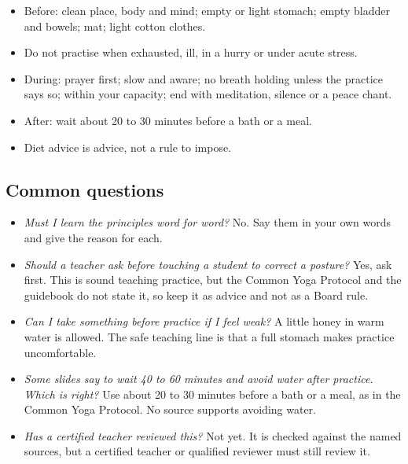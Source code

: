 \begin{recall}
\begin{itemize}
\item Before: clean place, body and mind; empty or light stomach; empty bladder and bowels; mat; light cotton clothes.
\item Do not practise when exhausted, ill, in a hurry or under acute stress.
\item During: prayer first; slow and aware; no breath holding unless the practice says so; within your capacity; end with meditation, silence or a peace chant.
\item After: wait about 20 to 30 minutes before a bath or a meal.
\item Diet advice is advice, not a rule to impose.
\end{itemize}
\end{recall}

\subsection*{Common questions}
\begin{itemize}
\item \emph{Must I learn the principles word for word?} No. Say them in your own words and give the reason for each.
\item \emph{Should a teacher ask before touching a student to correct a posture?} Yes, ask first. This is sound teaching practice, but the Common Yoga Protocol and the guidebook do not state it, so keep it as advice and not as a Board rule.
\item \emph{Can I take something before practice if I feel weak?} A little honey in warm water is allowed. The safe teaching line is that a full stomach makes practice uncomfortable.
\item \emph{Some slides say to wait 40 to 60 minutes and avoid water after practice. Which is right?} Use about 20 to 30 minutes before a bath or a meal, as in the Common Yoga Protocol. No source supports avoiding water.
\item \emph{Has a certified teacher reviewed this?} Not yet. It is checked against the named sources, but a certified teacher or qualified reviewer must still review it.
\end{itemize}

